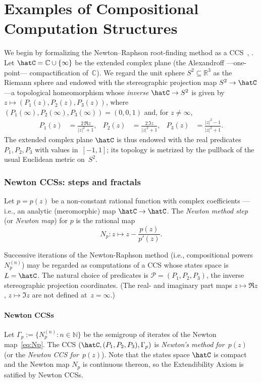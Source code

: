 
\section{Examples of Compositional Computation Structures}\label{sec:examples_CSS}

We begin by formalizing the Newton--Raphson root-finding method as a CCS~\cite{Galantai200025}, \cite[Section~2.3]{Burden2016numerical}.
Let $\hatC = \mathbb{C}\cup\{\infty\}$ be the extended complex plane (the Alexandroff —one-point— compactification of~$\mathbb{C}$).
We regard the unit sphere $S^2\subseteq \mathbb{R}^3$ as the Riemann sphere and endowed with the stereographic projection map $S^2\to\hatC$ —a topological homeomorphism whose \emph{inverse} $\hatC\rightarrow S^2$ is given by $z \mapsto (P_1(z), P_2(z), P_3(z))$, where $(P_1(\infty), P_2(\infty), P_3(\infty)) = (0,0,1)$ and, for $z\ne\infty$,
    \begin{align*}
        P_1(z) &= \frac{2\,\Re{z}}{|z|^2+1},&
        P_2(z) &= \frac{2\,\Im{z}}{|z|^2+1},&
        P_3(z) &= \frac{|z|^2-1}{|z|^2+1}.
    \end{align*}
The extended complex plane $\hatC$ is thus endowed with the real predicates $P_1, P_2, P_3$ with values in~$[-1,1]$; its topology is metrized by the pullback of the usual Euclidean metric on~$S^2$.

\subsubsection*{Newton CCSs: steps and fractals}\label{sec:Newton-map}
Let $p = p(z)$ be a non-constant rational function with complex coefficients —i.e., an analytic (meromorphic) map $\hatC\to\hatC$.
The \emph{Newton method step} (or \emph{Newton map}) for $p$ is the rational map
\begin{equation}\label{eq:Np}
    N_p\colon z \mapsto z-\frac{p(z)}{p'(z)}.
\end{equation}

Successive iterations of the Newton-Raphson method (i.e., compositional powers~$N_p^{(n)}$) may be regarded as computations of a CCS whose states space is $L = \hatC$.
The natural choice of predicates is $\mathcal{P} = (P_1, P_2, P_3)$,
the inverse stereographic projection coordinates.
(The real- and imaginary part maps $z\mapsto\Re{z}$, $z\mapsto\Im{z}$ are not defined at~$z = \infty$.)

\paragraph{Newton CCSs}
\label{sec:Newton-CCS}
Let $\Gamma_p:=\{N_p^{(n)}:n\in\mathbb{N}\}$ be the semigroup of iterates of the Newton map~\eqref{eq:Np}.
The CCS $(\hatC, (P_1,P_2,P_3), \Gamma_p)$ is \emph{Newton's method for~$p(z)$} (or the \emph{Newton CCS for~$p(z)$}).
Note that the states space $\hatC$ is compact and the Newton map $N_p$ is continuous thereon, so the Extendibility Axiom is satified by Newton CCSs.

